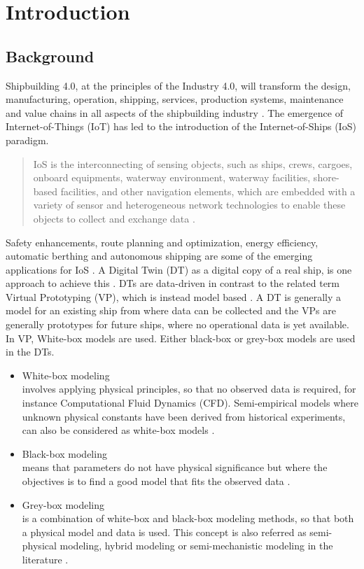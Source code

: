 \chapter{Introduction}
\section{Background}
Shipbuilding 4.0, at the principles of the Industry 4.0, will transform the design, manufacturing, operation, shipping, services, production systems, maintenance and value chains in all aspects of the shipbuilding 
industry \cite{stanic_toward_2018}.
The emergence of Internet-of-Things (IoT) has led to the introduction of the Internet-of-Ships (IoS) paradigm. \begin{quote} IoS is the interconnecting of sensing objects, such as ships, crews, cargoes, onboard equipments, waterway environment, waterway facilities, shore-based facilities, and other navigation elements, which are embedded with a variety of sensor and heterogeneous network technologies to enable these objects to collect and exchange data \cite{liu_internet_2016-1}.\end{quote}
Safety enhancements, route planning and optimization, energy efficiency, automatic berthing and autonomous shipping are some of the emerging applications for IoS \cite{aslam_internet_2020}.
A Digital Twin (DT) as a digital copy of a real ship, is one approach to achieve this \cite{chen_review_2021}. 
DTs are data-driven in contrast to the related term Virtual Prototyping (VP), which is instead model based \cite{major_framework_2021}. A DT is generally a model for an existing ship from where data can be collected and the VPs are generally prototypes for future ships, where no operational data is yet available.
In VP, White-box models are used. Either black-box or grey-box models are used in the DTs. 

\begin{itemize}
    \item White-box modeling \\
    involves applying physical principles, so that no observed data is required, for instance Computational Fluid Dynamics (CFD). Semi-empirical models where unknown physical constants have been derived from historical experiments, can also be considered as white-box models \cite{leifsson_grey-box_2008}.  

    \item Black-box modeling \\
    means that parameters do not have physical significance but where the objectives is to find a good model that fits the observed data \cite{lindskog_tools_1995}.
    
    \item Grey-box modeling \\
    is a combination of white-box and black-box modeling methods, so that both a physical model and data is used. This concept is also referred as semi-physical modeling, hybrid modeling or semi-mechanistic modeling in the literature \cite{leifsson_grey-box_2008}. 
\end{itemize}

